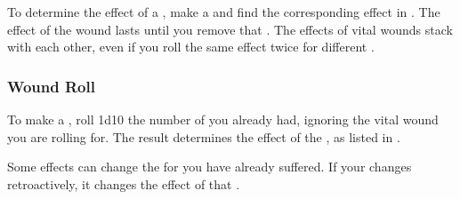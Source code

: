         To determine the effect of a , make a  and find the corresponding effect in .
        The effect of the wound lasts until you remove that .
        The effects of vital wounds stack with each other, even if you roll the same effect twice for different .

        \subsubsection{Wound Roll}\label{Wound Roll}
            To make a , roll 1d10 \sub the number of  you already had, ignoring the vital wound you are rolling for.
            The result determines the effect of the , as listed in .

            Some effects can change the  for  you have already suffered.
            If your  changes retroactively, it changes the effect of that .

